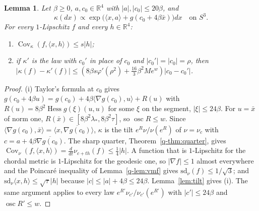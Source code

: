 \documentclass[11pt]{amsart}
\newtheorem{lemma}[theorem]{Lemma}
\theoremstyle{definition}
\theoremstyle{remark}
\numberwithin{equation}{section}
\newcommand{\R}{\mathbb{R}}
\newcommand{\Hess}{\operatorname{Hess}}
\newcommand{\Cov}{\operatorname{Cov}}
\newcommand{\ip}[2]{\langle #1,#2\rangle}
\begin{document}
\begin{lemma}\label{lem:onesite}
Let $\beta\ge0$, $a,c_0\in\R^4$ with $|a|,|c_0|\le20\beta$, and
\[
\kappa(dx)\propto\exp\bigl(\ip xa+g(c_0+4\beta\bar x)\bigr)dx
\quad\text{on }S^3 .
\]
For every $1$-Lipschitz $f$ and every $h\in\R^4$:
\begin{enumerate}[label=\textup{(\roman*)},leftmargin=*]
\item $\Cov_\kappa(f,\ip xh)\le s|h|$;
\item if $\kappa'$ is the law with $c_0'$ in place of $c_0$ and
$|c_0'|=|c_0|=\rho$, then $|\kappa(f)-\kappa'(f)|\le(8\beta s\varphi'(\rho^2)
+\frac{16}3\beta^2Me^w)|c_0-c_0'|$.
\end{enumerate}
\end{lemma}

\begin{proof}
(i) Taylor's formula at $c_0$ gives $g(c_0+4\beta u)=g(c_0)+4\beta\ip{\nabla
g(c_0)}u+R(u)$ with $R(u)=8\beta^2\Hess g(\xi)(u,u)$ for some $\xi$ on the
segment, $|\xi|\le24\beta$. For $u=\bar x$ of norm one, $R(\bar x)\in[8\beta^2
\lambda_*,8\beta^2\tau]$, so $\operatorname{osc}R\le w$. Since $\ip{\nabla
g(c_0)}{\bar x}=\ip x{\overline{\nabla g(c_0)}}$, $\kappa$ is the tilt
$e^{R}\nu/\nu(e^R)$ of $\nu=\nu_c$ with $c=a+4\beta\overline{\nabla g(c_0)}$.
The sharp quarter, Theorem~\ref{q-thm:quarter}, gives $\Cov_\nu(f,\ip xh)=\frac{d}{dt}
\nu_{c+th}(f)\le\frac14|h|$. A function that is $1$-Lipschitz for the
chordal metric is $1$-Lipschitz for the geodesic one, so $|\nabla f|\le1$
almost everywhere and the Poincar\'e inequality of Lemma~\ref{q-lem:vmf}
gives $\mathrm{sd}_\nu(f)\le1/\sqrt3$; and $\mathrm{sd}_\nu\ip xh\le\sqrt\tau|h|$
because $|c|\le|a|+4\beta\le24\beta$. Lemma~\ref{lem:tilt} gives (i). The
same argument applies to every law $e^{R'}\nu_{c'}/\nu_{c'}(e^{R'})$ with
$|c'|\le24\beta$ and $\operatorname{osc}R'\le w$.


\end{proof}
\end{document}
